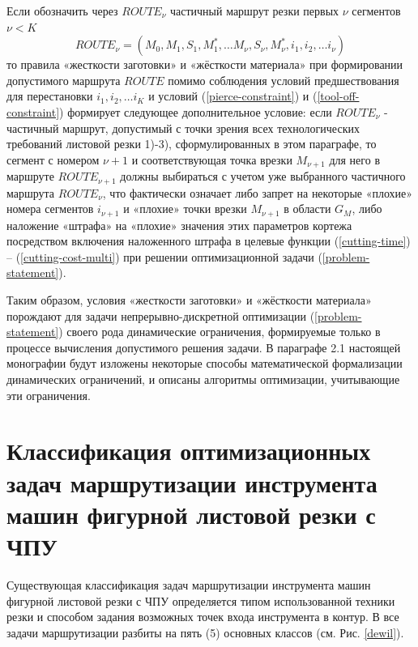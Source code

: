 \documentclass[12pt,twoside]{report}
\newcounter{lem}
\begin{document}
Если обозначить через
$ROUTE_\nu$
частичный маршрут резки первых $\nu$
сегментов
$\nu < K$
\begin{equation}
  ROUTE_\nu = (M_0, M_1, S_1, M_1^*, \dots M_\nu, S_\nu, M_\nu^*, i_1, i_2, \dots i_\nu)
\end{equation}
то правила «жесткости заготовки» и «жёсткости материала»
при формировании допустимого маршрута
$ROUTE$
помимо соблюдения условий предшествования для перестановки
$i_1, i_2, \dots i_K$
и условий (\ref{pierce-constraint}) и (\ref{tool-off-constraint})
формирует следующее дополнительное условие:
если
$ROUTE_\nu$ - частичный маршрут,
допустимый с точки зрения всех технологических
требований листовой резки 1)-3),
сформулированных в этом параграфе,
то сегмент с номером $\nu+1$
и соответствующая точка врезки $M_{\nu+1}$
для него в маршруте
$ROUTE_{\nu+1}$
должны выбираться с учетом уже выбранного частичного маршрута
$ROUTE_\nu$,
что фактически означает либо запрет
на некоторые «плохие» номера сегментов
$i_{\nu+1}$
и «плохие» точки врезки
$M_{\nu+1}$
в области  $G_M$,
либо наложение «штрафа» на «плохие» значения
этих параметров кортежа
посредством включения наложенного штрафа в целевые функции
(\ref{cutting-time}) – (\ref{cutting-cost-multi})
при решении оптимизационной задачи (\ref{problem-statement}).

Таким образом,
условия «жесткости заготовки» и «жёсткости материала»
порождают для задачи непрерывно-дискретной оптимизации (\ref{problem-statement})
своего рода динамические ограничения,
формируемые только в процессе вычисления допустимого решения задачи.
В параграфе 2.1
настоящей монографии будут изложены
некоторые способы математической формализации динамических ограничений,
и описаны алгоритмы оптимизации,
учитывающие эти ограничения.





\section{Классификация оптимизационных задач маршрутизации инструмента машин фигурной листовой резки с ЧПУ}

Существующая  классификация задач маршрутизации инструмента
машин фигурной листовой резки с ЧПУ определяется
типом использованной техники резки и способом задания
возможных точек входа инструмента в контур.
В \cite{intro13}
все задачи маршрутизации разбиты на пять (5) основных классов
(см. Рис. \ref{dewil}).
\end{document}
